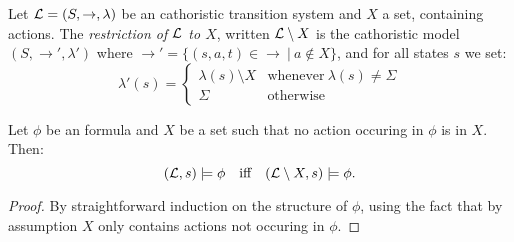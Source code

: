 

\begin{definition}
Let $\mathcal{L} = (S, \rightarrow, \lambda)$ be an cathoristic transition system
and $X$ a set, containing actions. The \emph{restriction of
  $\mathcal{L}$ to $X$}, written $\mathcal{L} \setminus X$ is the cathoristic model $(S,
\rightarrow', \lambda')$ where $\rightarrow' = \{(s, a, t) \in
\rightarrow \ |\ a \notin X\}$, and for all states $s$ we set:
\[
   \lambda'(s) 
        =
   \begin{cases}
       \lambda(s) \setminus  X & \text{whenever}\ \lambda(s) \neq \Sigma \\
       \Sigma & \text{otherwise}
   \end{cases}
\]

\end{definition}

\begin{lemma}\label{compactness:lemma:1717}
Let $\phi$ be an \cathoristic{} formula and $X$ be a set such that no action
occuring in $\phi$ is in $X$. Then:
\[
   (\mathcal{L}, s) \models \phi
      \quad\text{iff}\quad
   (\mathcal{L} \setminus X, s) \models \phi.
\]
\end{lemma}
\begin{proof}
By straightforward induction on the structure of $\phi$, using the
fact that by assumption $X$ only contains actions not occuring in
$\phi$.  
\end{proof}

